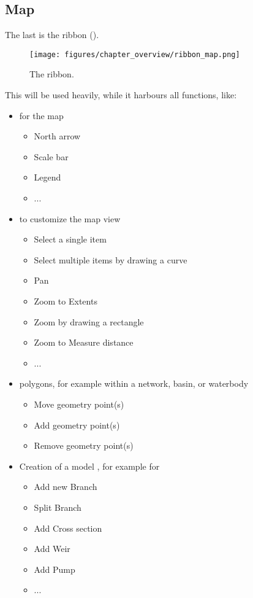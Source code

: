 \subsection{Map}
\label{ssec:ribbonmap}
The last  is the  ribbon ().
\begin{figure}[H]
	\centering
	\texttt{[image: figures/chapter\_overview/ribbon\_map.png]}
	\caption{The  ribbon.}
	\label{fig:ribbonmap}
\end{figure}
%
This will be used heavily, while it harbours all  functions, like:
\begin{itemize}
\item {} for the map
\begin{itemize}
	\item North arrow
	\item Scale bar
	\item Legend
	\item ...
\end{itemize}
\item {} to customize the map view
\begin{itemize}
	\item Select a single item
	\item Select multiple items by drawing a curve
	\item Pan
	\item Zoom to Extents
	\item Zoom by drawing a rectangle
	\item Zoom to Measure distance
	\item ...
\end{itemize}
\item {} polygons, for example within a network, basin, or waterbody
\begin{itemize}
	\item Move geometry point(s)
	\item Add geometry point(s)
	\item Remove geometry point(s)
\end{itemize}
\item Creation of a model , for example for \dflow
\begin{itemize}
	\item Add new Branch
	\item Split Branch
	\item Add Cross section
	\item Add Weir
	\item Add Pump
	\item ...
\end{itemize}
\end{itemize}
